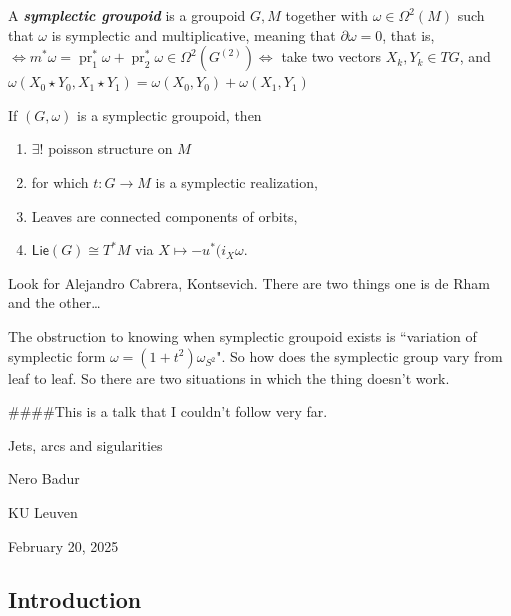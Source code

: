 \begin{defn}\leavevmode
A \textit{\textbf{symplectic groupoid}} is a groupoid \(G, M\) together with  \(\omega \in \Omega^2(M)\) such that \(\omega\) is symplectic and multiplicative, meaning that \(\partial  \omega =0\), that is, \(\iff m^*\omega=\operatorname{pr}_1^*\omega+\operatorname{pr}^*_2\omega\in \Omega^{2}(G^{(2)})\iff\) take two vectors \( X_k,Y_k \in TG\), and \(\omega(X_0 \star Y_0,X_1\star Y_1) =  \omega(X_0,Y_0) + \omega (X_1,Y_1)\)
\end{defn}

\begin{thm}\leavevmode
If \((G, \omega)\) is a symplectic groupoid, then
\begin{enumerate}
\item \(\exists !\) poisson structure on \(M\) 
\item for which \(t: G \to M\) is a symplectic realization,
\item  Leaves are connected components of orbits,
\item \(\mathsf{Lie}(G)\cong T^*M\) via \(X \mapsto -u ^*(i_X \omega\).
\end{enumerate}
\end{thm}

\begin{remark}\leavevmode
Look for Alejandro Cabrera, Kontsevich. There are two things one is de Rham and the other…
\end{remark}

\begin{upshot}\leavevmode
The obstruction to knowing when symplectic groupoid exists is ``variation of symplectic form \(\omega=(1+t^2) \omega_{S^2}\)". So how does the symplectic group vary from leaf to leaf. So there are two situations in which the thing doesn't work.
\end{upshot}

\iffalse
####This is a talk that I couldn't follow very far.

{\Huge Jets, arcs and sigularities}

\hfill{\Large Nero Badur}

{\Large \hfill KU Leuven}

\hfill{\large February 20, 2025}

\subsection{Introduction}

